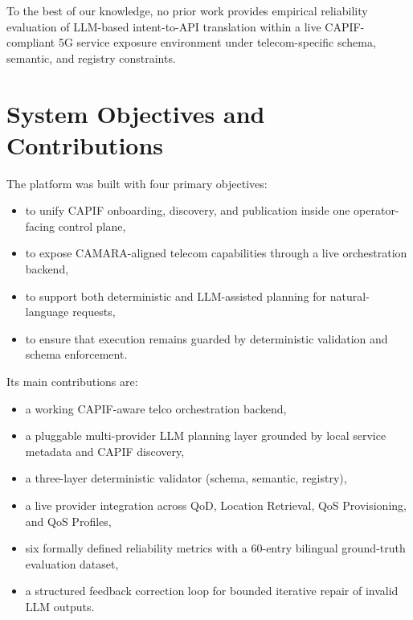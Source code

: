 \documentclass[conference]{IEEEtran}
\begin{document}
To the best of our knowledge, no prior work provides empirical reliability
evaluation of LLM-based intent-to-API translation within a live
CAPIF-compliant 5G service exposure environment under telecom-specific
schema, semantic, and registry constraints.

\section{System Objectives and Contributions}

The platform was built with four primary objectives:

\begin{itemize}[leftmargin=1.1em]
  \item to unify CAPIF onboarding, discovery, and publication inside one
        operator-facing control plane,
  \item to expose CAMARA-aligned telecom capabilities through a live
        orchestration backend,
  \item to support both deterministic and LLM-assisted planning for
        natural-language requests,
  \item to ensure that execution remains guarded by deterministic validation
        and schema enforcement.
\end{itemize}

Its main contributions are:

\begin{itemize}[leftmargin=1.1em]
  \item a working CAPIF-aware telco orchestration backend,
  \item a pluggable multi-provider LLM planning layer grounded by local
        service metadata and CAPIF discovery,
  \item a three-layer deterministic validator (schema, semantic, registry),
  \item a live provider integration across QoD, Location Retrieval,
        QoS Provisioning, and QoS Profiles,
  \item six formally defined reliability metrics with a 60-entry bilingual
        ground-truth evaluation dataset,
  \item a structured feedback correction loop for bounded iterative
        repair of invalid LLM outputs.
\end{itemize}
\end{document}
